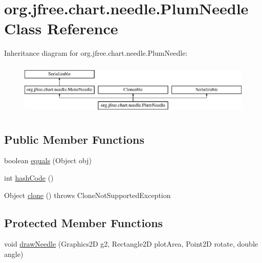 \hypertarget{classorg_1_1jfree_1_1chart_1_1needle_1_1_plum_needle}{}\section{org.\+jfree.\+chart.\+needle.\+Plum\+Needle Class Reference}
\label{classorg_1_1jfree_1_1chart_1_1needle_1_1_plum_needle}
Inheritance diagram for org.\+jfree.\+chart.\+needle.\+Plum\+Needle\+:\begin{figure}[H]
\begin{center}
\leavevmode
\includegraphics[height=2.533937cm]{classorg_1_1jfree_1_1chart_1_1needle_1_1_plum_needle}
\end{center}
\end{figure}
\subsection*{Public Member Functions}
\begin{DoxyCompactItemize}
\item 
boolean \mbox{\hyperlink{classorg_1_1jfree_1_1chart_1_1needle_1_1_plum_needle_aa65d6de84f9cb9b8c050420b84658452}{equals}} (Object obj)
\item 
int \mbox{\hyperlink{classorg_1_1jfree_1_1chart_1_1needle_1_1_plum_needle_ab20f676fef4c6f9c429fc92a3cc5d4c7}{hash\+Code}} ()
\item 
Object \mbox{\hyperlink{classorg_1_1jfree_1_1chart_1_1needle_1_1_plum_needle_a7c2cb80d5ec6d03ee5487b2b6aabb2e3}{clone}} ()  throws Clone\+Not\+Supported\+Exception 
\end{DoxyCompactItemize}
\subsection*{Protected Member Functions}
\begin{DoxyCompactItemize}
\item 
void \mbox{\hyperlink{classorg_1_1jfree_1_1chart_1_1needle_1_1_plum_needle_a8349350ec66285c5d7575107404145e7}{draw\+Needle}} (Graphics2D g2, Rectangle2D plot\+Area, Point2D rotate, double angle)
\end{DoxyCompactItemize}
